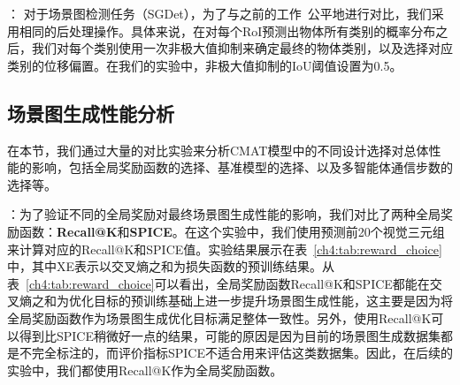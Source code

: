 \textbf{}： 对于场景图检测任务（SGDet），为了与之前的工作~\cite{zellers2018neural,zhang2019graphical}公平地进行对比，我们采用相同的后处理操作。具体来说，在对每个RoI预测出物体所有类别的概率分布之后，我们对每个类别使用一次非极大值抑制来确定最终的物体类别，以及选择对应类别的位移偏置。在我们的实验中，非极大值抑制的IoU阈值设置为0.5。


\subsection{场景图生成性能分析}
在本节，我们通过大量的对比实验来分析CMAT模型中的不同设计选择对总体性能的影响，包括全局奖励函数的选择、基准模型的选择、以及多智能体通信步数的选择等。

\textbf{}：为了验证不同的全局奖励对最终场景图生成性能的影响，我们对比了两种全局奖励函数：\textbf{Recall@K}和\textbf{SPICE}。在这个实验中，我们使用预测前20个视觉三元组来计算对应的Recall@K和SPICE值。实验结果展示在表~\ref{ch4:tab:reward_choice}中，其中XE表示以交叉熵之和为损失函数的预训练结果。从表~\ref{ch4:tab:reward_choice}可以看出，全局奖励函数Recall@K和SPICE都能在交叉熵之和为优化目标的预训练基础上进一步提升场景图生成性能，这主要是因为将全局奖励函数作为场景图生成优化目标满足整体一致性。另外，使用Recall@K可以得到比SPICE稍微好一点的结果，可能的原因是因为目前的场景图生成数据集都是不完全标注的，而评价指标SPICE不适合用来评估这类数据集。因此，在后续的实验中，我们都使用Recall@K作为全局奖励函数。

\begin{table}[t]
\begin{center}
\end{center}
\caption{不同全局奖励函数的选择对性能的影响}
\label{ch4:tab:reward_choice}
\end{table}

